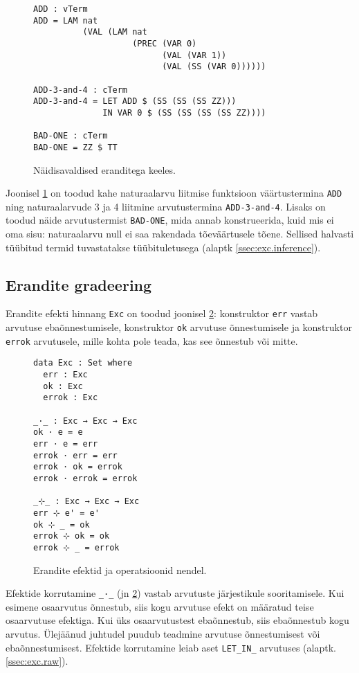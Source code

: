\documentclass[a4paper,12pt]{article}
\begin{document}
\begin{figure}
  \begin{verbatim}
ADD : vTerm
ADD = LAM nat
          (VAL (LAM nat
                    (PREC (VAR 0)
                          (VAL (VAR 1))
                          (VAL (SS (VAR 0))))))

ADD-3-and-4 : cTerm
ADD-3-and-4 = LET ADD $ (SS (SS (SS ZZ)))
              IN VAR 0 $ (SS (SS (SS (SS ZZ))))

BAD-ONE : cTerm
BAD-ONE = ZZ $ TT\end{verbatim}
  \caption{Näidisavaldised eranditega keeles.}
  \label{fig:exc.raw.ex1}
\end{figure}

Joonisel \ref{fig:exc.raw.ex1} on toodud kahe naturaalarvu liitmise funktsioon väärtustermina {\tt ADD}
ning naturaalarvude 3 ja 4 liitmine arvutustermina {\tt ADD-3-and-4}.
Lisaks on toodud näide arvutustermist {\tt BAD-ONE}, mida annab konstrueerida,
kuid mis ei oma sisu: naturaalarvu null ei saa rakendada tõeväärtusele tõene.
Sellised halvasti tüübitud termid tuvastatakse tüübituletusega (alaptk \ref{ssec:exc.inference}).

\subsection{Erandite gradeering} \label{ssec:exc.grading}

Erandite efekti hinnang {\tt Exc} on toodud joonisel \ref{fig:exc.exc}: konstruktor {\tt err} vastab arvutuse ebaõnnestumisele, konstruktor {\tt ok} arvutuse õnnestumisele ja konstruktor {\tt errok} arvutusele, mille kohta pole teada, kas see õnnestub või mitte.

\begin{figure}
  \begin{verbatim}
data Exc : Set where
  err : Exc
  ok : Exc
  errok : Exc

_·_ : Exc → Exc → Exc
ok · e = e
err · e = err
errok · err = err
errok · ok = errok
errok · errok = errok

_⊹_ : Exc → Exc → Exc
err ⊹ e' = e'
ok ⊹ _ = ok
errok ⊹ ok = ok
errok ⊹ _ = errok\end{verbatim}
  \caption{Erandite efektid ja operatsioonid nendel.}
  \label{fig:exc.exc}
\end{figure}

Efektide korrutamine {\tt _·_} (jn \ref{fig:exc.exc}) vastab arvutuste järjestikule sooritamisele.
Kui esimene osaarvutus õnnestub, siis kogu arvutuse efekt on määratud teise osaarvutuse efektiga.
Kui üks osaarvutustest ebaõnnestub, siis ebaõnnestub kogu arvutus.
Ülejäänud juhtudel puudub teadmine arvutuse õnnestumisest või ebaõnnestumisest.
Efektide korrutamine leiab aset {\tt LET_IN_} arvutuses (alaptk. \ref{ssec:exc.raw}).
\end{document}
